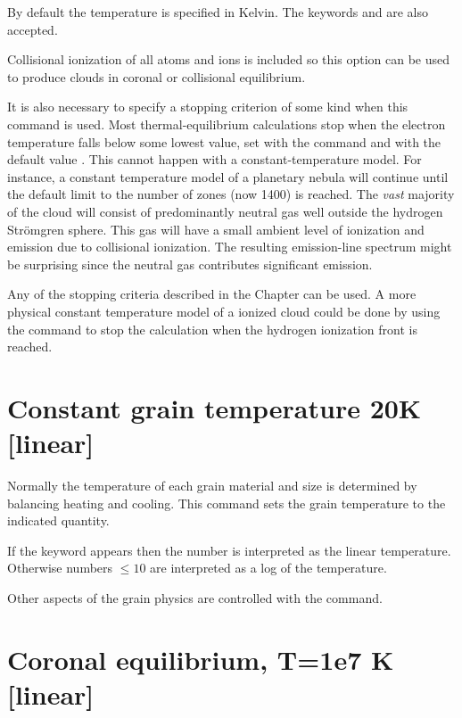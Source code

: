 By default the temperature is specified in Kelvin.
The keywords 
and  are also accepted.

Collisional ionization of all atoms and ions is included so this option
can be used to produce clouds in coronal or collisional equilibrium.

  It is also necessary to specify a
stopping criterion of some
kind when this command is used.
Most thermal-equilibrium calculations stop
when the electron temperature falls below some lowest value, set with the
 command and with the default
value \TempStopDefault.
This cannot happen with a constant-temperature model.
For
instance, a constant temperature model of a planetary nebula will
continue
until the default limit to the number of zones (now 1400) is reached.
The
\emph{vast} majority of the cloud will consist of predominantly
neutral gas well outside the hydrogen Str\"omgren sphere.
This gas will have a small ambient
level of ionization and emission due to collisional ionization.
The
resulting emission-line spectrum might be surprising since the neutral gas
contributes significant emission.

Any of the stopping criteria described in the
Chapter  can be used.
A more physical constant
temperature model of a ionized cloud could be done by using the
 command to stop the calculation when the hydrogen
ionization front is reached.

\section{Constant grain temperature 20K [linear]}

Normally the temperature of each grain material and size is determined
by balancing heating and cooling.  This command sets the grain temperature
to the indicated quantity.

If the  keyword appears then the number
is interpreted as the linear temperature.
Otherwise numbers $\le 10$ are interpreted as a log
of the temperature.

Other aspects of the grain physics are controlled with the
 command.

\section{Coronal equilibrium, T=1e7 K [linear]}
\label{sec:CommandCoronalEquilibrium}

